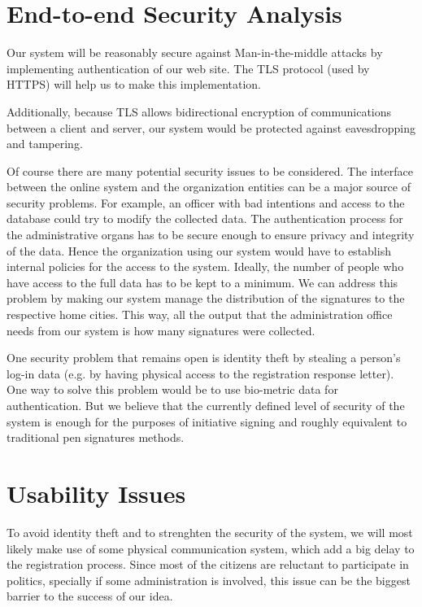 \documentclass[12pt,letter,titlepage]{article}
\begin{document}
\section{End-to-end Security Analysis}
Our system will be reasonably secure against Man-in-the-middle attacks by implementing authentication of our web site. The TLS protocol (used by HTTPS) will help us to make this implementation.

Additionally, because TLS allows bidirectional encryption of communications between a client and server, our system would be protected against eavesdropping and tampering.

Of course there are many potential security issues to be considered. The interface between the online system and the organization entities can be a major source of security problems. For example, an officer with bad intentions and access to the database could try to modify the collected data. The authentication process for the administrative organs has to be secure enough to ensure privacy and integrity of the data. Hence the organization using our system would have to establish internal policies for the access to the system. Ideally, the number of people who have access to the full data has to be kept to a minimum. We can address this problem by making our system manage the distribution of the signatures to the respective home cities. This way, all the output that the administration office needs from our system is how many signatures were collected.

One security problem that remains open is identity theft by stealing a person's log-in data (e.g. by having physical access to the registration response letter). One way to solve this problem would be to use bio-metric data for authentication. But we believe that the currently defined level of security of the system is enough for the purposes of initiative signing and roughly equivalent to traditional pen signatures methods.

\section{Usability Issues}
To avoid identity theft and to strenghten the security of the system, we will most likely make use of some physical communication system, which add a big delay to the registration process. Since most of the citizens are reluctant to participate in politics, specially if some administration is involved, this issue can be the biggest barrier to the success of our idea.
\end{document}
